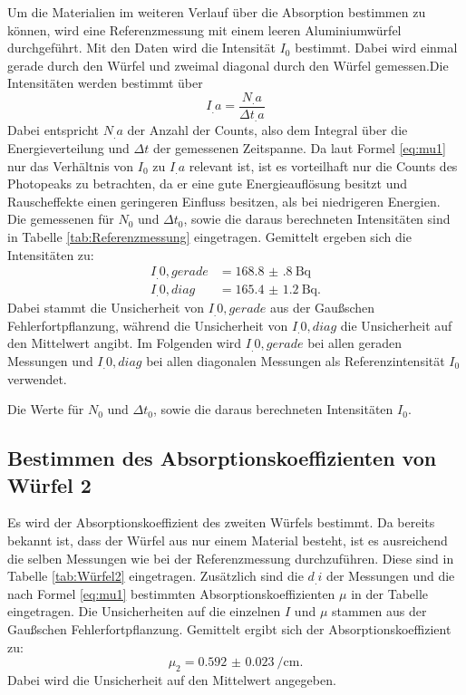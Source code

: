Um die Materialien im weiteren Verlauf über die Absorption bestimmen zu können, wird eine Referenzmessung mit einem leeren Aluminiumwürfel durchgeführt. Mit den Daten wird die Intensität $I_0$ bestimmt. Dabei wird einmal gerade durch den Würfel und zweimal diagonal durch den Würfel gemessen.Die Intensitäten werden bestimmt über
\begin{equation}
I_.a = \frac{N_.a}{\Delta t_.a}
\end{equation}
Dabei entspricht $N_.a$ der Anzahl der Counts, also dem Integral über die Energieverteilung und $\Delta t$ der gemessenen Zeitspanne. Da laut Formel \eqref{eq:mu1} nur das Verhältnis von $I_0$ zu $I_.a$ relevant ist, ist es vorteilhaft nur die Counts des Photopeaks zu betrachten, da er eine gute Energieauflösung besitzt und Rauscheffekte einen geringeren Einfluss besitzen, als bei niedrigeren Energien.\\
Die gemessenen für $N_0$ und $\Delta t_0$, sowie die daraus berechneten Intensitäten sind in Tabelle \ref{tab:Referenzmessung} eingetragen.
Gemittelt ergeben sich die Intensitäten zu:
\begin{align*}
I_.{0,gerade} &= \SI{168.8(8)}{\becquerel} \\
I_.{0,diag} &= \SI{165.4(12)}{\becquerel} \text{.}
\end{align*}
Dabei stammt die Unsicherheit von $I_.{0,gerade}$ aus der Gaußschen Fehlerfortpflanzung, während die Unsicherheit von $I_.{0,diag}$ die Unsicherheit auf den Mittelwert angibt.
Im Folgenden wird $I_.{0,gerade}$ bei allen geraden Messungen und $I_.{0,diag}$ bei allen diagonalen Messungen als Referenzintensität $I_0$ verwendet.

\begin{table}
	\centering
	\caption{Die Werte für $N_0$ und $\Delta t_0$, sowie die daraus berechneten Intensitäten $I_0$.}
	
	\label{tab:Referenzmessung}
\end{table}

\subsection{Bestimmen des Absorptionskoeffizienten von Würfel 2}

Es wird der Absorptionskoeffizient des zweiten Würfels bestimmt. Da bereits bekannt ist, dass der Würfel aus nur einem Material besteht, ist es ausreichend die selben Messungen wie bei der Referenzmessung durchzuführen. Diese sind in Tabelle \ref{tab:Würfel2} eingetragen. Zusätzlich sind die $d_.i$ der Messungen und die nach Formel \ref{eq:mu1} bestimmten Absorptionskoeffizienten $\mu$ in der Tabelle eingetragen. Die Unsicherheiten auf die einzelnen $I$ und $\mu$ stammen aus der Gaußschen Fehlerfortpflanzung.
Gemittelt ergibt sich der Absorptionskoeffizient zu:
\[
\mu_2 = \SI{0.592(23)}{\per\centi\metre}\text{.}
\]
Dabei wird die Unsicherheit auf den Mittelwert angegeben.

